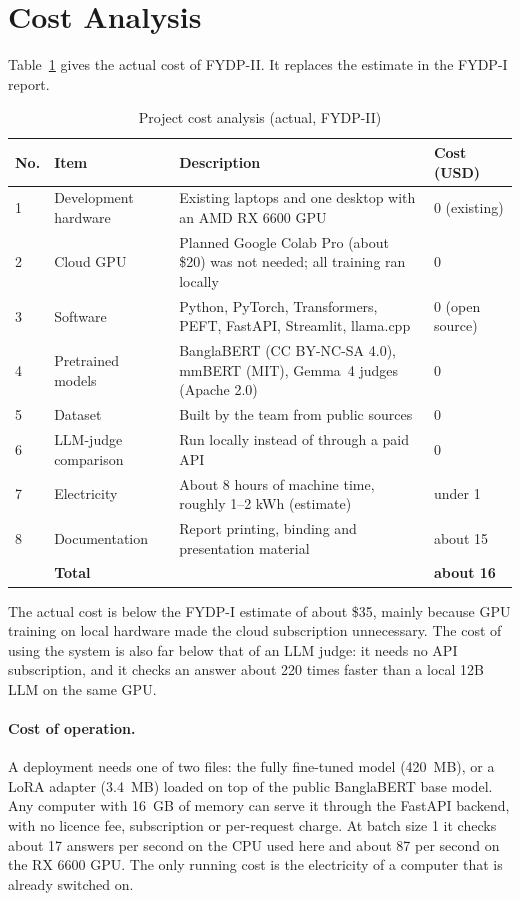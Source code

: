 \section{Cost Analysis}
\label{sec:cost}

Table~\ref{tab:cost} gives the actual cost of FYDP-II. It replaces the estimate
in the FYDP-I report.

\begin{table}[htbp]
\centering
\small
\caption{Project cost analysis (actual, FYDP-II)}
\label{tab:cost}
\begin{tabular}{p{0.4cm}p{3.2cm}p{5.6cm}p{2.2cm}}
\hline
\textbf{No.} & \textbf{Item} & \textbf{Description} & \textbf{Cost (USD)} \\
\hline
1 & Development hardware & Existing laptops and one desktop with an AMD RX 6600 GPU & 0 (existing) \\
2 & Cloud GPU & Planned Google Colab Pro (about \$20) was not needed; all training ran locally & 0 \\
3 & Software & Python, PyTorch, Transformers, PEFT, FastAPI, Streamlit, llama.cpp & 0 (open source) \\
4 & Pretrained models & BanglaBERT (CC BY-NC-SA 4.0), mmBERT (MIT), Gemma~4 judges (Apache 2.0) & 0 \\
5 & Dataset & Built by the team from public sources & 0 \\
6 & LLM-judge comparison & Run locally instead of through a paid API & 0 \\
7 & Electricity & About 8 hours of machine time, roughly 1--2 kWh (estimate) & under 1 \\
8 & Documentation & Report printing, binding and presentation material & about 15 \\
\hline
 & \textbf{Total} & & \textbf{about 16} \\
\hline
\end{tabular}
\end{table}

The actual cost is below the FYDP-I estimate of about \$35, mainly because GPU
training on local hardware made the cloud subscription unnecessary. The cost of
using the system is also far below that of an LLM judge: it needs no API
subscription, and it checks an answer about 220 times faster than a local 12B
LLM on the same GPU.

\paragraph{Cost of operation.} A deployment needs one of two files: the fully
fine-tuned model (420~MB), or a LoRA adapter (3.4~MB) loaded on top of the
public BanglaBERT base model. Any computer with 16~GB of memory can serve it
through the FastAPI backend, with no licence fee, subscription or per-request
charge. At batch size 1 it checks about 17 answers per second on the CPU used
here and about 87 per second on the RX 6600 GPU. The only running cost is the
electricity of a computer that is already switched on.

